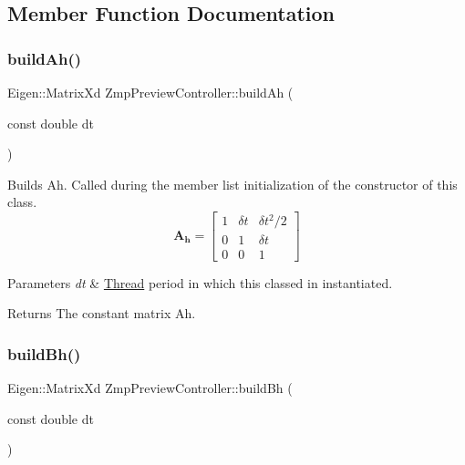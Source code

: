\subsection{Member Function Documentation}
\hypertarget{classZmpPreviewController_a39ffdba07960f90a6cce247065f12504}{}\label{classZmpPreviewController_a39ffdba07960f90a6cce247065f12504} 
\subsubsection{\texorpdfstring{build\+Ah()}{buildAh()}}
{\footnotesize\ttfamily Eigen\+::\+Matrix\+Xd Zmp\+Preview\+Controller\+::build\+Ah (\begin{DoxyParamCaption}\item[{const double}]{dt }\end{DoxyParamCaption})}

Builds Ah. Called during the member list initialization of the constructor of this class. \[ \mathbf{A_h} = \left[ \begin{array}{ccc} 1 & \delta t & \delta t^2/2 \\ 0 & 1 & \delta t \\ 0 & 0 & 1 \end{array} \right] \]


\begin{DoxyParams}{Parameters}
{\em dt} & \hyperlink{classThread}{Thread} period in which this classed in instantiated.\\
\hline
\end{DoxyParams}
\begin{DoxyReturn}{Returns}
The constant matrix Ah. 
\end{DoxyReturn}
\hypertarget{classZmpPreviewController_a0114a8bdba920b9a7fb6b35e7b90ddd1}{}\label{classZmpPreviewController_a0114a8bdba920b9a7fb6b35e7b90ddd1} 
\subsubsection{\texorpdfstring{build\+Bh()}{buildBh()}}
{\footnotesize\ttfamily Eigen\+::\+Matrix\+Xd Zmp\+Preview\+Controller\+::build\+Bh (\begin{DoxyParamCaption}\item[{const double}]{dt }\end{DoxyParamCaption})}

